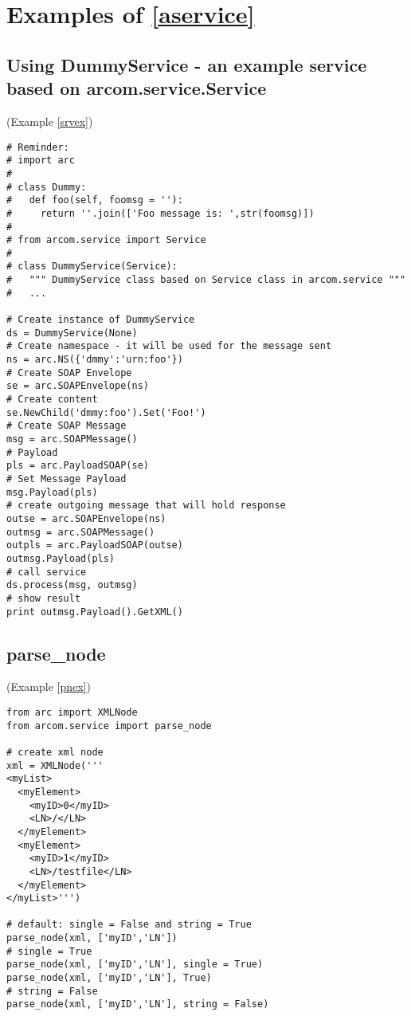 \section{Examples of \ref{aservice}}
\subsection{Using DummyService - an example service based on arcom.service.Service}
(Example \ref{srvex})
\label{csrvex}
\begin{verbatim}
# Reminder:
# import arc
#
# class Dummy:
#   def foo(self, foomsg = ''):
#     return ''.join(['Foo message is: ',str(foomsg)])
# 
# from arcom.service import Service
# 
# class DummyService(Service):
#   """ DummyService class based on Service class in arcom.service """
#   ...

# Create instance of DummyService
ds = DummyService(None)
# Create namespace - it will be used for the message sent
ns = arc.NS({'dmmy':'urn:foo'})
# Create SOAP Envelope
se = arc.SOAPEnvelope(ns)
# Create content
se.NewChild('dmmy:foo').Set('Foo!')
# Create SOAP Message
msg = arc.SOAPMessage()
# Payload
pls = arc.PayloadSOAP(se)
# Set Message Payload
msg.Payload(pls)
# create outgoing message that will hold response
outse = arc.SOAPEnvelope(ns)
outmsg = arc.SOAPMessage()
outpls = arc.PayloadSOAP(outse)
outmsg.Payload(pls)
# call service
ds.process(msg, outmsg)
# show result
print outmsg.Payload().GetXML()
\end{verbatim}

\subsection{parse\_node}
(Example \ref{pnex})
\label{cpnex}
\begin{verbatim}
from arc import XMLNode
from arcom.service import parse_node

# create xml node
xml = XMLNode('''
<myList>
  <myElement>
    <myID>0</myID>
    <LN>/</LN>
  </myElement>
  <myElement>
    <myID>1</myID>
    <LN>/testfile</LN>
  </myElement>
</myList>''')

# default: single = False and string = True
parse_node(xml, ['myID','LN'])
# single = True
parse_node(xml, ['myID','LN'], single = True)
parse_node(xml, ['myID','LN'], True)
# string = False
parse_node(xml, ['myID','LN'], string = False)
\end{verbatim}

